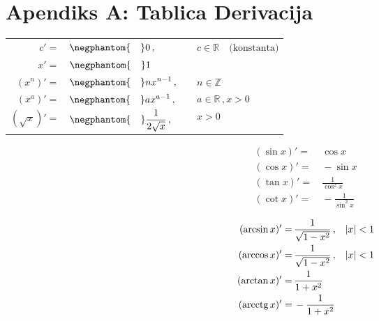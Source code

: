 \section{Apendiks A: Tablica Derivacija}

\begin{center}


\begin{tabular}{rlll}
    $c' =$&$\negphantom{\quad}0\,,$ && $\displaystyle c\in\mathbb{R}\quad \text{(konstanta)}$\\
    $x' =$&$\negphantom{\quad}1$&&\\
    $\displaystyle (x^n)'=$&$\negphantom{\quad}\displaystyle nx^{n-1}\,,$ && $\displaystyle n\in\mathbb{Z}$\\
    $\displaystyle (x^a)'=$&$\negphantom{\quad}\displaystyle ax^{a-1}\,,$ && $\displaystyle a\in\mathbb{R}\,, x>0$\\
    $\displaystyle (\sqrt{x})'=$&$\negphantom{\quad}\displaystyle \frac{1}{2\sqrt{x}}\,,$ && $x>0$
\end{tabular}


\begin{multicols}{2}
    \begin{align*}
        (\sin x)' =&\,\cos x\\
        (\cos x)' =&\,-\sin x\\
        (\tan x)' =&\,\frac{1}{\cos^2 x}\\
        (\cot x)'=&\,-\frac{1}{\sin^2 x}
    \end{align*}

    \columnbreak

    \begin{align*}
        (\arcsin x)' =&\,\frac{1}{\sqrt{1 - x^2}}\,,&&|x| < 1\\
        (\arccos x)' =&\,\frac{1}{\sqrt{1 - x^2}}\,,&&|x| < 1\\
        (\arctan x)' =&\,\frac{1}{1+x^2}\\
        (\text{arcctg\,} x)'=&\,-\frac{1}{1+x^2}
    \end{align*}
\end{multicols}


\end{center}
